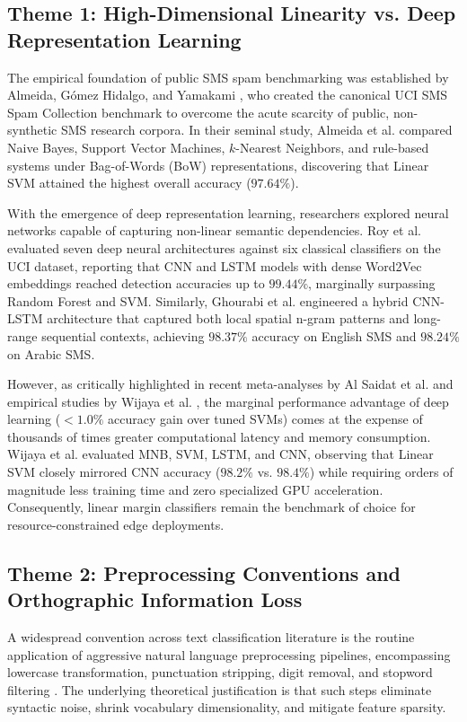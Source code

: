 \documentclass[conference]{IEEEtran}
\begin{document}
\subsection{Theme 1: High-Dimensional Linearity vs. Deep Representation Learning}
The empirical foundation of public SMS spam benchmarking was established by Almeida, G{\'o}mez Hidalgo, and Yamakami \cite{almeida2011contributions}, who created the canonical UCI SMS Spam Collection benchmark to overcome the acute scarcity of public, non-synthetic SMS research corpora. In their seminal study, Almeida et al. compared Naive Bayes, Support Vector Machines, $k$-Nearest Neighbors, and rule-based systems under Bag-of-Words (BoW) representations, discovering that Linear SVM attained the highest overall accuracy ($97.64\%$). 

With the emergence of deep representation learning, researchers explored neural networks capable of capturing non-linear semantic dependencies. Roy et al. \cite{roy2020deep} evaluated seven deep neural architectures against six classical classifiers on the UCI dataset, reporting that CNN and LSTM models with dense Word2Vec embeddings reached detection accuracies up to $99.44\%$, marginally surpassing Random Forest and SVM. Similarly, Ghourabi et al. \cite{ghourabi2020hybrid} engineered a hybrid CNN-LSTM architecture that captured both local spatial n-gram patterns and long-range sequential contexts, achieving $98.37\%$ accuracy on English SMS and $98.24\%$ on Arabic SMS. 

However, as critically highlighted in recent meta-analyses by Al Saidat et al. \cite{alsaidat2024advancements} and empirical studies by Wijaya et al. \cite{wijaya2023spam}, the marginal performance advantage of deep learning ($<1.0\%$ accuracy gain over tuned SVMs) comes at the expense of thousands of times greater computational latency and memory consumption. Wijaya et al. \cite{wijaya2023spam} evaluated MNB, SVM, LSTM, and CNN, observing that Linear SVM closely mirrored CNN accuracy ($98.2\%$ vs. $98.4\%$) while requiring orders of magnitude less training time and zero specialized GPU acceleration. Consequently, linear margin classifiers remain the benchmark of choice for resource-constrained edge deployments.

\subsection{Theme 2: Preprocessing Conventions and Orthographic Information Loss}
A widespread convention across text classification literature is the routine application of aggressive natural language preprocessing pipelines, encompassing lowercase transformation, punctuation stripping, digit removal, and stopword filtering \cite{yerima2022comparative, shdefat2024machine}. The underlying theoretical justification is that such steps eliminate syntactic noise, shrink vocabulary dimensionality, and mitigate feature sparsity. 
\end{document}
